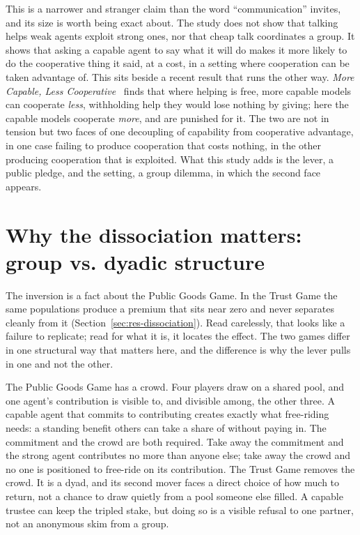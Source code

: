 This is a narrower and stranger claim than the word ``communication'' invites, and its size is
worth being exact about. The study does not show that talking helps weak agents exploit strong
ones, nor that cheap talk coordinates a group. It shows that asking a capable agent to say what
it will do makes it more likely to do the cooperative thing it said, at a cost, in a setting
where cooperation can be taken advantage of. This sits beside a recent result that runs the
other way. \emph{More Capable, Less Cooperative}~\cite{morecapable2026} finds that where helping
is free, more capable models can cooperate \emph{less}, withholding help they would lose nothing
by giving; here the capable models cooperate \emph{more}, and are punished for it. The two are not
in tension but two faces of one decoupling of capability from cooperative advantage, in one case
failing to produce cooperation that costs nothing, in the other producing cooperation that is
exploited. What this study adds is the lever, a public pledge, and the setting, a group dilemma,
in which the second face appears.

\section{Why the dissociation matters: group vs. dyadic structure}
\label{sec:disc-dissociation}

The inversion is a fact about the Public Goods Game. In the Trust Game the same populations
produce a premium that sits near zero and never separates cleanly from it
(Section~\ref{sec:res-dissociation}). Read carelessly, that looks like a failure to replicate;
read for what it is, it locates the effect. The two games differ in one structural way that
matters here, and the difference is why the lever pulls in one and not the other.

The Public Goods Game has a crowd. Four players draw on a shared pool, and one agent's
contribution is visible to, and divisible among, the other three. A capable agent that commits
to contributing creates exactly what free-riding needs: a standing benefit others can take a
share of without paying in. The commitment and the crowd are both required. Take away the
commitment and the strong agent contributes no more than anyone else; take away the crowd and
no one is positioned to free-ride on its contribution. The Trust Game removes the crowd. It is a
dyad, and its second mover faces a direct choice of how much to return, not a chance to draw
quietly from a pool someone else filled. A capable trustee can keep the tripled stake, but doing
so is a visible refusal to one partner, not an anonymous skim from a group.

